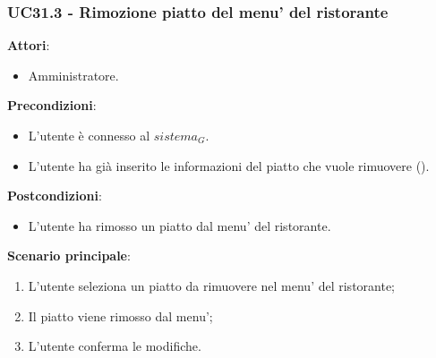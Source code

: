 \subsubsection{UC31.3 - Rimozione piatto del menu' del ristorante}\label{usecase:31_3}
\textbf{Attori}:
\begin{itemize}
    \item Amministratore.
\end{itemize}
\textbf{Precondizioni}:
\begin{itemize}
    \item L'utente è connesso al $\textit{sistema}_G$.
    \item L'utente ha già inserito le informazioni del piatto che vuole rimuovere ().
\end{itemize}
\textbf{Postcondizioni}:
\begin{itemize}
    \item L'utente ha rimosso un piatto dal menu' del ristorante.
\end{itemize}
\textbf{Scenario principale}:
\begin{enumerate}
    \item L'utente seleziona un piatto da rimuovere nel menu' del ristorante;
    \item Il piatto viene rimosso dal menu';
    \item L'utente conferma le modifiche.
\end{enumerate}
\newpage
